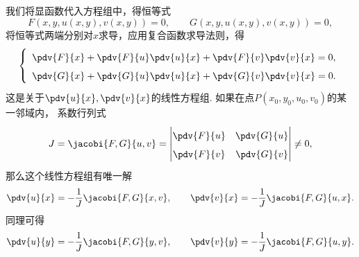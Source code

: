 我们将显函数代入方程组中，得恒等式\begin{equation*}
	F(x,y,u(x,y),v(x,y))=0, \qquad
	G(x,y,u(x,y),v(x,y))=0,
\end{equation*}
将恒等式两端分别对\(x\)求导，应用复合函数求导法则，得\begin{equation*}
	\left\{ \def\arraystretch{1.6} \begin{array}{l}
		\pdv{F}{x}+\pdv{F}{u}\pdv{u}{x}+\pdv{F}{v}\pdv{v}{x}=0, \\
		\pdv{G}{x}+\pdv{G}{u}\pdv{u}{x}+\pdv{G}{v}\pdv{v}{x}=0.
	\end{array} \right.
\end{equation*}
这是关于\(\pdv{u}{x},\pdv{v}{x}\)的线性方程组.
如果在点\(P(x_0,y_0,u_0,v_0)\)的某一邻域内，
系数行列式\begin{equation*}
	J = \jacobi{F,G}{u,v}
	= \begin{vmatrix}
		\pdv{F}{u} & \pdv{G}{u} \\
		\pdv{F}{v} & \pdv{G}{v}
	\end{vmatrix}
	\neq0,
\end{equation*}
那么这个线性方程组有唯一解\begin{equation*}
	\pdv{u}{x} = -\frac{1}{J} \jacobi{F,G}{x,v}, \qquad
	\pdv{v}{x} = -\frac{1}{J} \jacobi{F,G}{u,x}.
\end{equation*}
同理可得\begin{equation*}
	\pdv{u}{y} = -\frac{1}{J} \jacobi{F,G}{y,v}, \qquad
	\pdv{v}{y} = -\frac{1}{J} \jacobi{F,G}{u,y}.
\end{equation*}

